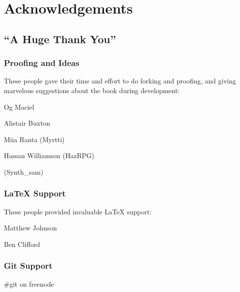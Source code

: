\chapter{Acknowledgements}
\section{``A Huge Thank You''}

\subsection{Proofing and Ideas}
These people gave their time and effort to do forking and proofing, and giving marvelous suggestions about the book during development:

Og Maciel

Alistair Buxton

Miia Ranta (Myrtti)

Hassan Williamson (HazRPG)

(Synth\_sam)

\subsection{\LaTeX{} Support}
These people provided invaluable \LaTeX{} support:

Matthew Johnson

Ben Clifford

\subsection{Git Support}
\#git on freenode
